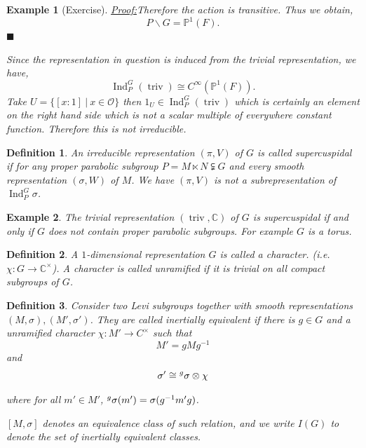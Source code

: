 \documentclass[8pt]{article}
\newenvironment{claimproof}[1]{\par\noindent\underline{Proof:}\space#1}{\hfill $\blacksquare$}
\newtheorem{definition}{Definition}[section]
\newtheorem{example}{Example}[section]
\DeclareMathOperator{\triv}{triv}
\DeclareMathOperator{\Ind}{Ind}
\newcommand{\C}[0]{\mathbb{C}}
\newcommand{\Para}[0]{\mathbb{P}}
\newcommand{\sep}[0]{\:|\:}
\newcommand{\Ouv}{\mathcal{O}}
\newcommand{\tens}[1]{%
  \mathbin{\mathop{\otimes}\displaylimits_{#1}}%
}
\begin{document}
\begin{example}[Exercise]
\begin{claimproof}
  Therefore the action is transitive. Thus we obtain,
  \begin{equation*}
    P\backslash G = \Para^1(F).
  \end{equation*}
\end{claimproof}
\par Since the representation in question is induced from the trivial representation, we have,
\begin{equation*}
\Ind_P^G(\triv)\cong C^\infty(\Para^1(F)).
\end{equation*}
Take $U=\{[x:1]\sep x\in\Ouv\}$ then $1_U\in \Ind_P^G(\triv)$ which is certainly an element on the right hand side which is not a scalar multiple of everywhere constant function. Therefore this is not irreducible.
\end{example}

\begin{definition}
An irreducible representation $(\pi,V)$ of $G$ is called supercuspidal if for any proper parabolic subgroup $P=M\ltimes N\subsetneqq G$ and every smooth representation $(\sigma, W)$ of $M$. We have $(\pi,V)$ is not a subrepresentation of $\Ind_P^G\sigma$.
\end{definition}

\begin{example}
The trivial representation $(\triv,\C)$ of $G$ is supercuspidal if and only if $G$ does not contain proper parabolic subgroups. For example $G$ is a torus.
\end{example}

\begin{definition}
A $1$-dimensional representation $G$ is called a character. (i.e. $\chi:G\to\C^\times$). A character is called unramified if it is trivial on all compact subgroups of $G$.
\end{definition}

\begin{definition}
Consider two Levi subgroups together with smooth representations $(M,\sigma),(M',\sigma')$. They are called inertially equivalent if there is $g\in G$ and a unramified character $\chi:M'\to C^\times$ such that  
\begin{equation*}
M' = gMg^{-1}
\end{equation*}
and
\begin{equation*}
\sigma' \cong \prescript{g}{}{\sigma}\tens{}\chi
\end{equation*}
where for all $m'\in M'$, $\prescript{g}{}{\sigma}(m') = \sigma(g^{-1}m'g)$.
\par $[M,\sigma]$ denotes an equivalence class of such relation, and we write $I(G)$ to denote the set of inertially equivalent classes.
\end{definition}
\end{document}

